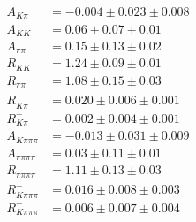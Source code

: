 \begin{align*}
A_{K\pi} & = -0.004 \pm 0.023 \pm 0.008 \\
A_{KK} & = 0.06 \pm 0.07 \pm 0.01 \\
A_{\pi\pi} & = 0.15 \pm 0.13 \pm 0.02 \\
R_{KK} & = 1.24 \pm 0.09 \pm 0.01 \\
R_{\pi\pi} & = 1.08 \pm 0.15 \pm 0.03 \\
R^+_{K\pi} & = 0.020 \pm 0.006 \pm 0.001 \\
R^-_{K\pi} & = 0.002 \pm 0.004 \pm 0.001 \\
A_{K\pi\pi\pi} & = -0.013 \pm 0.031 \pm 0.009 \\
A_{\pi\pi\pi\pi} & = 0.03 \pm 0.11 \pm 0.01 \\
R_{\pi\pi\pi\pi} & = 1.11 \pm 0.13 \pm 0.03 \\
R^+_{K\pi\pi\pi} & = 0.016 \pm 0.008 \pm 0.003 \\
R^-_{K\pi\pi\pi} & = 0.006 \pm 0.007 \pm 0.004 \\
\end{align*}

